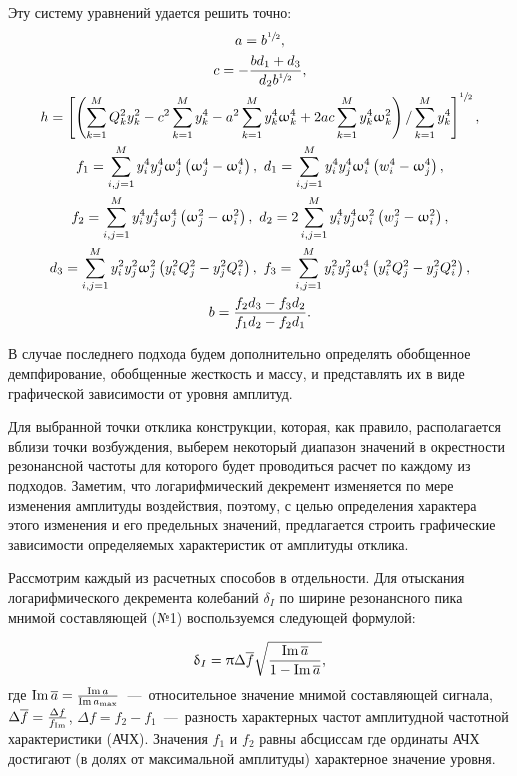 Эту систему уравнений удается решить точно:
\begin{equation}
	\begin{gathered}
		a = b ^ {\sfrac{1}{2}}, \\
		c = -\frac{b d_1 + d_3}{d_2 b ^ {\sfrac{1}{2}}}, \\
		h = \left[ \left( \sum_{k = 1} ^ M Q_k ^ 2 y_k ^ 2 - c ^ 2 \sum_{k = 1} ^ M y_k ^ 4 - a ^ 2 \sum_{k = 1} ^ M y_k ^ 4 \upomega_k ^ 4 + 2 a c \sum_{k = 1} ^ M y_k ^ 4 \upomega_k ^ 2 \right) / \sum_{k = 1} ^ M y_k ^ 4 \right] ^ {\sfrac{1}{2}}, \\ 
		f_1 = \sum_{i, j = 1} ^ M y_i ^ 4 y_j ^ 4 \upomega_j ^ 4 \left( \upomega_j ^ 4 - \upomega_i ^ 4 \right), \ d_1 = \sum_{i, j = 1} ^ M y_i ^ 4 y_j ^ 4 \upomega_i ^ 4 \left( w_i ^ 4 - \upomega_j ^ 4 \right), \\
		f_2 = \sum_{i, j = 1} ^ M y_i ^ 4 y_j ^ 4 \upomega_j ^ 4 \left( \upomega_j ^ 2 - \upomega_i ^ 2 \right), \ d_2 = 2 \sum_{i, j = 1} ^ M y_i ^ 4 y_j ^ 4 \upomega_i ^ 2 \left( w_j ^ 2 - \upomega_i ^ 2 \right), \\
		d_3 = \sum_{i, j = 1} ^ M y_i ^ 2 y_j ^ 2 \upomega_j ^ 2 \left( y_i ^ 2 Q_j ^ 2 - y_j ^ 2 Q_i ^ 2 \right), \ f_3 = \sum_{i, j = 1} ^ M y_i ^ 2 y_j ^ 2 \upomega_i ^ 4 \left( y_i ^ 2 Q_j ^ 2 - y_j ^ 2 Q_i ^ 2 \right), \\
		b = \frac{f_2 d_3 - f_3 d_2}{f_1 d_2 - f_2 d_1}.
	\end{gathered}
	\label{eq:generalModalSolution}
\end{equation}

В случае последнего подхода будем дополнительно определять обобщенное демпфирование, обобщенные жесткость и массу, и представлять их в виде графической зависимости от уровня амплитуд.

Для выбранной точки отклика конструкции, которая, как правило, располагается вблизи точки возбуждения, выберем некоторый диапазон значений в окрестности резонансной частоты для которого будет проводиться расчет по каждому из подходов. Заметим, что логарифмический декремент изменяется по мере изменения амплитуды воздействия, поэтому, с целью определения характера этого изменения и его предельных значений, предлагается
строить графические зависимости определяемых характеристик от амплитуды отклика.

Рассмотрим каждый из расчетных способов в отдельности. Для отыскания логарифмического декремента колебаний $ \delta_I $ по ширине резонансного пика мнимой составляющей (№1) воспользуемся следующей формулой:

\begin{equation}
	\updelta_I = \uppi \Delta \overline{f} \sqrt{\frac{\operatorname{Im} \overline{a}}{1 - \operatorname{Im} \overline{a}}}, \label{eq:decrementWidthImaginaryPeak}
\end{equation}
где $ \operatorname{Im} \overline{a} = \frac{\operatorname{Im} a}{\operatorname{Im} a_{\max}} $~---~относительное значение мнимой составляющей сигнала, $ \Delta \overline{f} = \frac{\Delta f}{f_{\operatorname{Im}}}$, $ \Delta f = f_2 - f_1 $~---~разность характерных частот амплитудной частотной характеристики (АЧХ). Значения $ f_1 $ и $ f_2 $ равны абсциссам где ординаты АЧХ достигают (в долях от максимальной амплитуды) характерное значение уровня.

